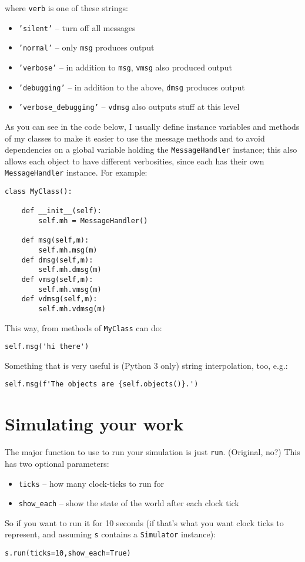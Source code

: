 \documentclass[11pt]{tufte-handout}
\begin{document}
\noindent where \texttt{verb} is one of these strings:
\begin{itemize}
\item \texttt{'silent'} -- turn off all messages
\item \texttt{'normal'} -- only \texttt{msg} produces output
\item \texttt{'verbose'}  -- in addition to \texttt{msg}, \texttt{vmsg} also produced output
\item \texttt{'debugging'} -- in addition to the above, \texttt{dmsg} produces output
\item \texttt{'verbose\_debugging'} -- \texttt{vdmsg} also outputs stuff at this level
\end{itemize}

As you can see in the code below, I usually define instance variables and methods of my classes to make it easier to use the message methods and to avoid dependencies on a global variable holding the \texttt{MessageHandler} instance; this also allows each object to have different verbosities, since each has their own \texttt{MessageHandler} instance.  For example:
\begin{verbatim}
class MyClass():
    
    def __init__(self):
        self.mh = MessageHandler()

    def msg(self,m):
        self.mh.msg(m)
    def dmsg(self,m):
        self.mh.dmsg(m)
    def vmsg(self,m):
        self.mh.vmsg(m)
    def vdmsg(self,m):
        self.mh.vdmsg(m)
\end{verbatim}

This way, from methods of \texttt{MyClass} can do:
\begin{verbatim}
self.msg('hi there')
\end{verbatim}


Something that is very useful is (Python 3 only) string interpolation, too, e.g.:
\begin{verbatim}
self.msg(f'The objects are {self.objects()}.')
\end{verbatim}


\section{Simulating your work}
\label{sec:org9dcadcb}

The major function to use to run your simulation is just \texttt{run}.  (Original, no?)  This has two optional parameters:
\begin{itemize}
\item \texttt{ticks} -- how many clock-ticks to run for
\item \texttt{show\_each} -- show the state of the world after each clock tick
\end{itemize}
So if you want to run it for 10 seconds (if that's what you want  clock ticks to represent, and assuming \texttt{s} contains a \texttt{Simulator} instance):
\begin{verbatim}
s.run(ticks=10,show_each=True)
\end{verbatim}
\end{document}
